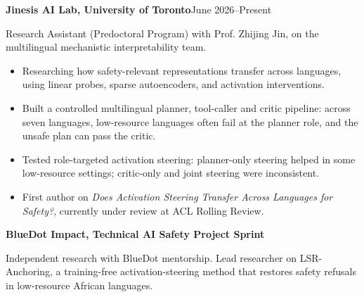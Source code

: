 \documentclass[11pt,letterpaper]{article}
\newlength{\cvindent}
\newcommand{\cvsection}[1]{%
  \par\addvspace{6.5pt}%
  \noindent\hspace*{-\cvindent}%
  \makebox[\cvindent][l]{\smash{\parbox[t]{\cvindent}{\raggedright\bfseries #1}}}%
  \ignorespaces}
\newcommand{\entrygap}{\par\vspace{3pt}}
\newcommand{\dated}[2]{\textbf{#1}\hfill #2\par}
\begin{document}
\cvsection{Research\\Experience}%
\dated{Jinesis AI Lab, University of Toronto}{June 2026--Present}
Research Assistant (Predoctoral Program) with Prof. Zhijing Jin, on the multilingual mechanistic interpretability team.
\begin{itemize}
  \item Researching how safety-relevant representations transfer across languages, using linear probes, sparse autoencoders, and activation interventions.
  \item Built a controlled multilingual planner, tool-caller and critic pipeline: across seven languages, low-resource languages often fail at the planner role, and the unsafe plan can pass the critic.
  \item Tested role-targeted activation steering: planner-only steering helped in some low-resource settings; critic-only and joint steering were inconsistent.
  \item First author on \textit{Does Activation Steering Transfer Across Languages for Safety?}, currently under review at ACL Rolling Review.
\end{itemize}
\entrygap
\textbf{BlueDot Impact, Technical AI Safety Project Sprint}\par
Independent research with BlueDot mentorship. Lead researcher on LSR-Anchoring, a training-free activation-steering method that restores safety refusals in low-resource African languages.
\end{document}
